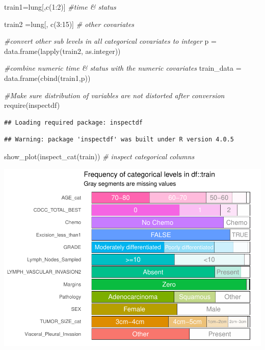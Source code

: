 \documentclass[
  11pt,
]{article}
\newenvironment{Shaded}{\begin{snugshade}}{\end{snugshade}}
\newcommand{\CommentTok}[1]{\textcolor[rgb]{0.56,0.35,0.01}{\textit{#1}}}
\newcommand{\DecValTok}[1]{\textcolor[rgb]{0.00,0.00,0.81}{#1}}
\newcommand{\FunctionTok}[1]{\textcolor[rgb]{0.00,0.00,0.00}{#1}}
\newcommand{\NormalTok}[1]{#1}
\newcommand{\OtherTok}[1]{\textcolor[rgb]{0.56,0.35,0.01}{#1}}
\newcommand{\SpecialCharTok}[1]{\textcolor[rgb]{0.00,0.00,0.00}{#1}}
\begin{document}
\begin{Shaded}
\begin{Highlighting}[]
\NormalTok{train1}\OtherTok{=}\NormalTok{lung[,}\FunctionTok{c}\NormalTok{(}\DecValTok{1}\SpecialCharTok{:}\DecValTok{2}\NormalTok{)] }\CommentTok{\#time \& status}

\NormalTok{train2 }\OtherTok{=}\NormalTok{lung[, }\FunctionTok{c}\NormalTok{(}\DecValTok{3}\SpecialCharTok{:}\DecValTok{15}\NormalTok{)] }\CommentTok{\# other covariates}

\CommentTok{\#convert other sub levels in all categorical covariates to integer}
\NormalTok{p }\OtherTok{=} \FunctionTok{data.frame}\NormalTok{(}\FunctionTok{lapply}\NormalTok{(train2, as.integer))}

\CommentTok{\#combine numeric time \& status with the numeric covariates}
\NormalTok{train\_data }\OtherTok{=} \FunctionTok{data.frame}\NormalTok{(}\FunctionTok{cbind}\NormalTok{(train1,p)) }

\CommentTok{\#Make sure distribution of variables are not distorted after conversion}
\FunctionTok{require}\NormalTok{(inspectdf)}
\end{Highlighting}
\end{Shaded}

\begin{verbatim}
## Loading required package: inspectdf
\end{verbatim}

\begin{verbatim}
## Warning: package 'inspectdf' was built under R version 4.0.5
\end{verbatim}

\begin{Shaded}
\begin{Highlighting}[]
\FunctionTok{show\_plot}\NormalTok{(}\FunctionTok{inspect\_cat}\NormalTok{(train)) }\CommentTok{\# inspect categorical columns }
\end{Highlighting}
\end{Shaded}

\includegraphics{Hazard_and_Risk_plot_updated_files/figure-latex/unnamed-chunk-10-1.pdf}
\end{document}
